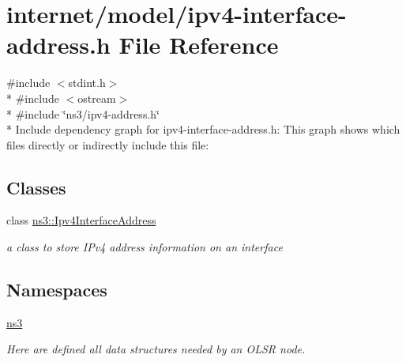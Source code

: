 \hypertarget{ipv4-interface-address_8h}{}\section{internet/model/ipv4-\/interface-\/address.h File Reference}
\label{ipv4-interface-address_8h}
{\ttfamily \#include $<$stdint.\+h$>$}\\*
{\ttfamily \#include $<$ostream$>$}\\*
{\ttfamily \#include \char`\"{}ns3/ipv4-\/address.\+h\char`\"{}}\\*
Include dependency graph for ipv4-\/interface-\/address.h\+:
This graph shows which files directly or indirectly include this file\+:
\subsection*{Classes}
\begin{DoxyCompactItemize}
\item 
class \hyperlink{classns3_1_1Ipv4InterfaceAddress}{ns3\+::\+Ipv4\+Interface\+Address}
\begin{DoxyCompactList}\small\item\em a class to store I\+Pv4 address information on an interface \end{DoxyCompactList}\end{DoxyCompactItemize}
\subsection*{Namespaces}
\begin{DoxyCompactItemize}
\item 
 \hyperlink{namespacens3}{ns3}
\begin{DoxyCompactList}\small\item\em Here are defined all data structures needed by an O\+L\+SR node. \end{DoxyCompactList}\end{DoxyCompactItemize}
